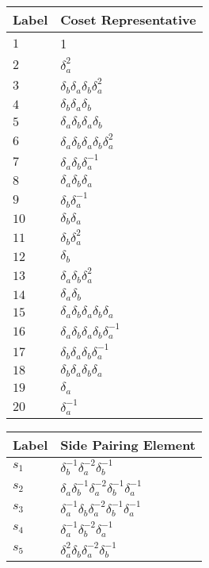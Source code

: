 \documentclass{article}
\begin{document}
\begin{center}
\begin{tabular}{ll}
\toprule
Label & Coset Representative\\
\midrule
$1$ & 1 \\
$2$ & $\delta_a^{2}$ \\
$3$ & $\delta_b^{}\delta_a^{}\delta_b^{}\delta_a^{2}$ \\
$4$ & $\delta_b^{}\delta_a^{}\delta_b^{}$ \\
$5$ & $\delta_a^{}\delta_b^{}\delta_a^{}\delta_b^{}$ \\
$6$ & $\delta_a^{}\delta_b^{}\delta_a^{}\delta_b^{}\delta_a^{2}$ \\
$7$ & $\delta_a^{}\delta_b^{}\delta_a^{-1}$ \\
$8$ & $\delta_a^{}\delta_b^{}\delta_a^{}$ \\
$9$ & $\delta_b^{}\delta_a^{-1}$ \\
$10$ & $\delta_b^{}\delta_a^{}$ \\
$11$ & $\delta_b^{}\delta_a^{2}$ \\
$12$ & $\delta_b^{}$ \\
$13$ & $\delta_a^{}\delta_b^{}\delta_a^{2}$ \\
$14$ & $\delta_a^{}\delta_b^{}$ \\
$15$ & $\delta_a^{}\delta_b^{}\delta_a^{}\delta_b^{}\delta_a^{}$ \\
$16$ & $\delta_a^{}\delta_b^{}\delta_a^{}\delta_b^{}\delta_a^{-1}$ \\
$17$ & $\delta_b^{}\delta_a^{}\delta_b^{}\delta_a^{-1}$ \\
$18$ & $\delta_b^{}\delta_a^{}\delta_b^{}\delta_a^{}$ \\
$19$ & $\delta_a^{}$ \\
$20$ & $\delta_a^{-1}$ \\
\bottomrule
\end{tabular}
\hfill
\begin{tabular}{ll}
\toprule
Label & Side Pairing Element\\
\midrule
$s_{1}$ & $\delta_b^{-1}\delta_a^{-2}\delta_b^{-1}$ \\
$s_{2}$ & $\delta_a^{}\delta_b^{-1}\delta_a^{-2}\delta_b^{-1}\delta_a^{-1}$ \\
$s_{3}$ & $\delta_a^{-1}\delta_b^{}\delta_a^{-2}\delta_b^{-1}\delta_a^{-1}$ \\
$s_{4}$ & $\delta_a^{-1}\delta_b^{-2}\delta_a^{-1}$ \\
$s_{5}$ & $\delta_a^{2}\delta_b^{}\delta_a^{-2}\delta_b^{-1}$ \\

\end{tabular}
\end{center}
\end{document}

